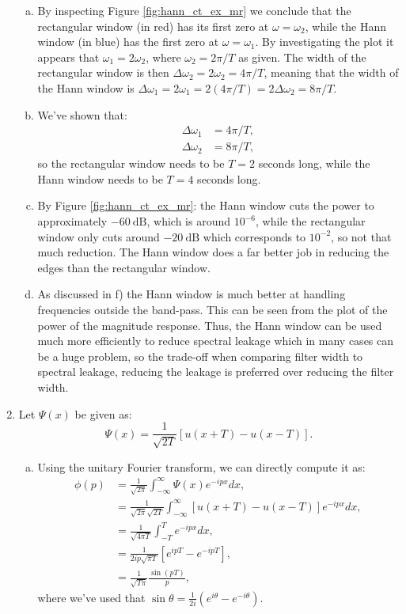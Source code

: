 \begin{enumerate}
\begin{enumerate}[a)]
\item By inspecting Figure \ref{fig:hann_ct_ex_mr} we conclude that the rectangular window (in red) 
has its first zero at $\omega=\omega_{2}$, while the Hann window (in blue) has the first zero at $\omega=\omega_{1}$. 
By investigating the plot it appears that $\omega_{1}=2\omega_{2}$, where $\omega_{2}=2\pi /T$ as given. 
The width of the rectangular window is then $\Delta\omega_{2}=2\omega_{2}=4\pi/T$, meaning that the 
width of the Hann window is $\Delta\omega_{1}=2\omega_{1}=2(4\pi/T)=2\Delta\omega_{2}=8\pi /T$. 

\item We've shown that:
\begin{align*}
    \Delta\omega_{1}&=4\pi/T, \\
    \Delta\omega_{2}&=8\pi/T,
\end{align*}
so the rectangular window needs to be $T=2$ seconds long, while the Hann window needs to be $T=4$ seconds long. 

\item By Figure \ref{fig:hann_ct_ex_mr}: the Hann window cuts the power to approximately $-60\ \text{dB}$, 
which is around $10^{-6}$, while the rectangular window only cuts around $-20\ \text{dB}$ which corresponds to $10^{-2}$, so not that much reduction. The Hann window does a far better job in reducing the edges than the rectangular window.

\item As discussed in f) the Hann window is much better at handling frequencies outside the band-pass. 
This can be seen from the plot of the power of the magnitude response. Thus, the Hann window can be used much more efficiently
 to reduce spectral leakage which in many cases can be a huge problem, so the trade-off when comparing filter width to spectral 
 leakage, reducing the leakage is preferred over reducing the filter width.


\end{enumerate}

\item Let $\Psi(x)$ be given as:
\begin{equation*}
\Psi(x) = \frac{1}{\sqrt{2T}}[u(x + T) - u(x - T)].
\end{equation*}

\begin{enumerate}[a)]
\item Using the unitary Fourier transform, we can directly compute it as:
\begin{align*}
    \phi(p) &= \frac{1}{\sqrt{2\pi}}\int_{-\infty}^{\infty}\Psi(x)e^{-ip x}dx, \\
            &= \frac{1}{\sqrt{2\pi}\sqrt{2T}}\int_{-\infty}^{\infty} [u(x+T) - u(x-T)]e^{-ip x}dx, \\
            &= \frac{1}{\sqrt{4\pi T}}\int_{-T}^{T}e^{-ip x}dx, \\
            &= \frac{1}{2ip\sqrt{\pi T}}[e^{ip T} - e^{-ip T}], \\
            &= \frac{1}{\sqrt{T\pi }}\frac{\sin(p T)}{p},
\end{align*}
where we've used that $\sin\theta = \frac{1}{2i}(e^{i\theta}-e^{-i\theta})$.


\end{enumerate}
\end{enumerate}
